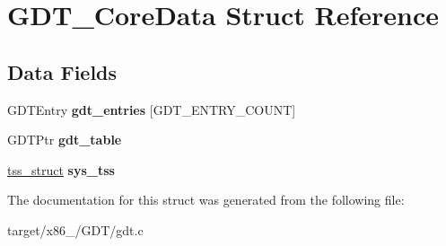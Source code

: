 \hypertarget{structGDT__CoreData}{}\section{G\+D\+T\+\_\+\+Core\+Data Struct Reference}
\label{structGDT__CoreData}
\subsection*{Data Fields}
\begin{DoxyCompactItemize}
\item 
G\+D\+T\+Entry {\bfseries gdt\+\_\+entries} \mbox{[}G\+D\+T\+\_\+\+E\+N\+T\+R\+Y\+\_\+\+C\+O\+U\+NT\mbox{]}\hypertarget{structGDT__CoreData_a91e070d3121701fa368add425cc8399e}{}\label{structGDT__CoreData_a91e070d3121701fa368add425cc8399e}

\item 
G\+D\+T\+Ptr {\bfseries gdt\+\_\+table}\hypertarget{structGDT__CoreData_aa0878d9c59a9f7f5d1db862594bac8cd}{}\label{structGDT__CoreData_aa0878d9c59a9f7f5d1db862594bac8cd}

\item 
\hyperlink{structtss__struct}{tss\+\_\+struct} {\bfseries sys\+\_\+tss}\hypertarget{structGDT__CoreData_ab1b8461ff9f32467adc66351415560b8}{}\label{structGDT__CoreData_ab1b8461ff9f32467adc66351415560b8}

\end{DoxyCompactItemize}


The documentation for this struct was generated from the following file\+:\begin{DoxyCompactItemize}
\item 
target/x86\+\_/\+G\+D\+T/gdt.\+c\end{DoxyCompactItemize}
